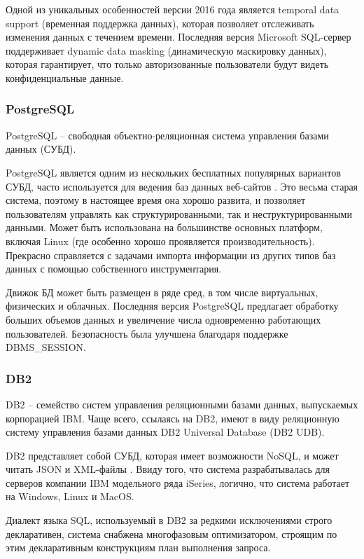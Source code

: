 \documentclass[a4paper,14pt]{extreport}
\begin{document}
Одной из уникальных особенностей версии 2016 года является temporal data support (временная поддержка данных), которая позволяет отслеживать изменения данных с течением времени. Последняя версия Microsoft SQL-сервер поддерживает dynamic data masking (динамическую маскировку данных), которая гарантирует, что только авторизованные пользователи будут видеть конфиденциальные данные.

\subsubsection*{PostgreSQL}

PostgreSQL \cite{pg} -- свободная объектно-реляционная система управления базами данных (СУБД).

PostgreSQL является одним из нескольких бесплатных популярных вариантов СУБД, часто используется для ведения баз данных веб-сайтов \cite{cmp_db}. Это весьма старая система, поэтому в настоящее время она хорошо развита, и позволяет пользователям управлять как структурированными, так и неструктурированными данными. Может быть использована на большинстве основных платформ, включая Linux (где особенно хорошо проявляется производительность). Прекрасно справляется с задачами импорта информации из других типов баз данных с помощью собственного инструментария.

Движок БД может быть размещен в ряде сред, в том числе виртуальных, физических и облачных. Последняя версия PostgreSQL предлагает обработку больших объемов данных и увеличение числа одновременно работающих пользователей. Безопасность была улучшена благодаря поддержке DBMS\_SESSION.

\subsubsection*{DB2}

DB2 \cite{db2} -- семейство систем управления реляционными базами данных, выпускаемых корпорацией IBM. Чаще всего, ссылаясь на DB2, имеют в виду реляционную систему управления базами данных DB2 Universal Database (DB2 UDB).

DB2 представляет собой СУБД, которая имеет возможности NoSQL, и может читать JSON и XML-файлы  \cite{cmp_db}. Ввиду того, что система разрабатывалась для серверов компании IBM модельного ряда iSeries, логично, что система работает на Windows, Linux и MacOS.

Диалект языка SQL, используемый в DB2 за редкими исключениями строго декларативен, система снабжена многофазовым оптимизатором, строящим по этим декларативным конструкциям план выполнения запроса.
\end{document}
